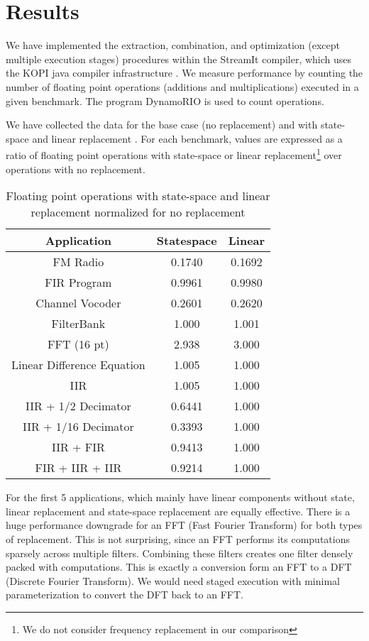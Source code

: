 \section{Results}

    We have implemented the extraction, combination, and
optimization (except multiple execution stages) procedures within
the StreamIt compiler, which uses the KOPI java compiler
infrastructure \cite{kopi}. We measure performance by counting the
number of floating point operations (additions and
multiplications) executed in a given benchmark. The program
DynamoRIO \cite{dynamo} is used to count operations.

    We have collected the data for the base case (no replacement) and
with state-space and linear replacement \cite{Lamb}. For each
benchmark, values are expressed as a ratio of floating point
operations with state-space or linear replacement\footnote{We do
not consider frequency replacement in our comparison} over
operations with no replacement.
\begin{table}[tbp]
\begin{center}
\begin{tabular} {c|c|c}
Application & Statespace & Linear \\ \hline
FM Radio & 0.1740 & 0.1692 \\
FIR Program &  0.9961 & 0.9980 \\
Channel Vocoder & 0.2601 & 0.2620 \\
FilterBank & 1.000 & 1.001 \\
FFT (16 pt) & 2.938 & 3.000 \\
Linear Difference Equation & 1.005 & 1.000 \\
IIR & 1.005 & 1.000 \\
IIR + 1/2 Decimator & 0.6441 & 1.000 \\
IIR + 1/16 Decimator & 0.3393 & 1.000 \\
IIR + FIR & 0.9413 & 1.000 \\
FIR + IIR + IIR & 0.9214 & 1.000
\end{tabular}
\caption{Floating point operations with state-space and linear
replacement normalized for no replacement}
\end{center}
\end{table}

    For the first 5 applications, which mainly have linear
components without state, linear replacement and state-space
replacement are equally effective. There is a huge performance
downgrade for an FFT (Fast Fourier Transform) for both types of
replacement. This is not surprising, since an FFT performs its
computations sparsely across multiple filters. Combining these
filters creates one filter densely packed with computations. This
is exactly a conversion form an FFT to a DFT (Discrete Fourier
Transform). We would need staged execution with minimal
parameterization to convert the DFT back to an FFT.

